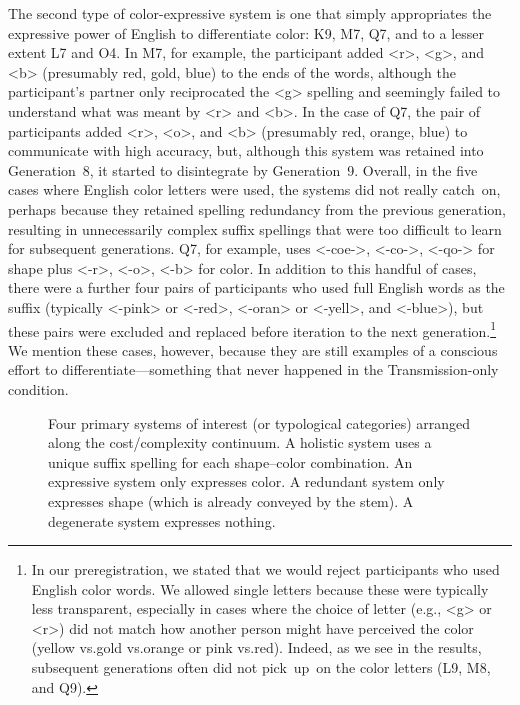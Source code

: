 \documentclass[doc,biblatex]{apa7}
\begin{document}
The second type of color-expressive system is one that simply appropriates the expressive power of English to differentiate color: K9, M7, Q7, and to a lesser extent L7 and O4. In M7, for example, the participant added <r>, <g>, and <b> (presumably red, gold, blue) to the ends of the words, although the participant's partner only reciprocated the <g> spelling and seemingly failed to understand what was meant by <r> and <b>. In the case of Q7, the pair of participants added <r>, <o>, and <b> (presumably red, orange, blue) to communicate with high accuracy, but, although this system was retained into Generation~8, it started to disintegrate by Generation~9. Overall, in the five cases where English color letters were used, the systems did not really catch~on, perhaps because they retained spelling redundancy from the previous generation, resulting in unnecessarily complex suffix spellings that were too difficult to learn for subsequent generations. Q7, for example, uses <-coe->, <-co->, <-qo-> for shape plus <-r>, <-o>, <-b> for color. In addition to this handful of cases, there were a further four pairs of participants who used full English words as the suffix (typically <-pink> or <-red>, <-oran> or <-yell>, and <-blue>), but these pairs were excluded and replaced before iteration to the next generation.\footnote{In our preregistration, we stated that we would reject participants who used English color words. We allowed single letters because these were typically less transparent, especially in cases where the choice of letter (e.g., <g> or <r>) did not match how another person might have perceived the color (yellow vs.\@ gold vs.\@ orange or pink vs.\@ red). Indeed, as we see in the results, subsequent generations often did not pick~up~on the color letters (L9, M8, and Q9).} We mention these cases, however, because they are still examples of a conscious effort to differentiate---something that never happened in the Transmission-only condition.

	\begin{figure}
	\vspace*{2pt}
	\caption{Four primary systems of interest (or typological categories) arranged along the cost/complexity continuum. A holistic system uses a unique suffix spelling for each shape--color combination. An expressive system only expresses color. A redundant system only expresses shape (which is already conveyed by the stem). A degenerate system expresses nothing.}
	\label{typology}
	\end{figure}
\end{document}
